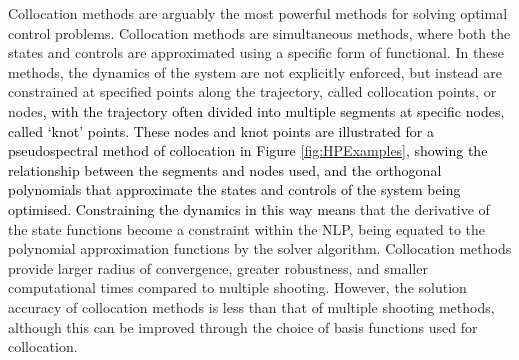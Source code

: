 Collocation methods are arguably the most powerful methods for solving optimal control problems\cite{Rao2009}. Collocation methods are simultaneous methods, where both the states and controls are approximated using a specific form of functional\cite{Kelly2015,Rao2009}. In these methods, the dynamics of the system are not explicitly enforced, but instead are constrained at specified points along the trajectory, called collocation points, or nodes\cite{Kelly2015}\textcolor{black}{, with the trajectory often divided into multiple segments at specific nodes, called `knot' points. These nodes and knot points are illustrated for a pseudospectral method of collocation in Figure \ref{fig:HPExamples}, showing the relationship between the segments and nodes used, and the orthogonal polynomials that approximate the states and controls of the system being optimised. Constraining the dynamics in this way means} that the derivative of the state functions become a constraint within the NLP, being equated to the polynomial approximation functions by the solver algorithm. 
Collocation methods provide larger radius of convergence, greater robustness, and smaller computational times compared to multiple shooting\cite{Fasano2013}. However, the solution accuracy of collocation methods is less than that of multiple shooting methods\cite{Fasano2013}, although this can be improved through the choice of basis functions used for collocation\cite{Rao2009}.

